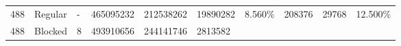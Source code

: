 \documentclass[11pt]{article}
\begin{document}
\begin{longtable}[]{@{}llllllllll@{}}
\begin{minipage}[t]{0.09\columnwidth}
488\strut
\end{minipage} & \begin{minipage}[t]{0.06\columnwidth}\raggedright\strut
Regular\strut
\end{minipage} & \begin{minipage}[t]{0.09\columnwidth}\raggedright\strut
-\strut
\end{minipage} & \begin{minipage}[t]{0.07\columnwidth}\raggedright\strut
465095232\strut
\end{minipage} & \begin{minipage}[t]{0.06\columnwidth}\raggedright\strut
212538262\strut
\end{minipage} & \begin{minipage}[t]{0.07\columnwidth}\raggedright\strut
19890282\strut
\end{minipage} & \begin{minipage}[t]{0.07\columnwidth}\raggedright\strut
8.560\%\strut
\end{minipage} & \begin{minipage}[t]{0.06\columnwidth}\raggedright\strut
208376\strut
\end{minipage} & \begin{minipage}[t]{0.07\columnwidth}\raggedright\strut
29768\strut
\end{minipage} & \begin{minipage}[t]{0.07\columnwidth}\raggedright\strut
12.500\%\strut
\end{minipage}\tabularnewline
\begin{minipage}[t]{0.09\columnwidth}\raggedright\strut
488\strut
\end{minipage} & \begin{minipage}[t]{0.06\columnwidth}\raggedright\strut
Blocked\strut
\end{minipage} & \begin{minipage}[t]{0.09\columnwidth}\raggedright\strut
8\strut
\end{minipage} & \begin{minipage}[t]{0.07\columnwidth}\raggedright\strut
493910656\strut
\end{minipage} & \begin{minipage}[t]{0.06\columnwidth}\raggedright\strut
244141746\strut
\end{minipage} & \begin{minipage}[t]{0.07\columnwidth}\raggedright\strut
2813582\strut
\end{minipage} & \begin{minipage}[t]{0.07\columnwidth}\raggedright\strut

\end{minipage}
\end{longtable}
\end{document}
